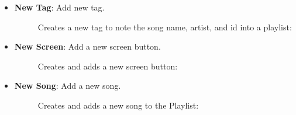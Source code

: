\documentclass{article}
\begin{document}
\begin{itemize}
    \item \textbf{New Tag}: Add new tag.
    \begin{description}
        \item[] Creates a new tag to note the song name, artist, and id into a playlist:
    \end{description}
    \item \textbf{New Screen}: Add a new screen button.
    \begin{description}
        \item[] Creates and adds a new screen button:
    \end{description}
        \item \textbf{New Song}: Add a new song.
    \begin{description}
        \item[] Creates and adds a new song to the Playlist:
    \end{description}


\end{itemize}
\end{document}
